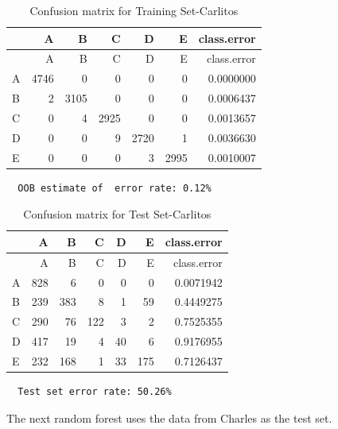 \documentclass[12pt,twoside]{reedthesis}
\begin{document}
  \begin{longtable}[c]{@{}lrrrrrr@{}}
  \caption{Confusion matrix for Training Set-Carlitos}\tabularnewline
  \toprule
  & A & B & C & D & E & class.error\tabularnewline
  \midrule
  \endfirsthead
  \toprule
  & A & B & C & D & E & class.error\tabularnewline
  \midrule
  \endhead
  A & 4746 & 0 & 0 & 0 & 0 & 0.0000000\tabularnewline
  B & 2 & 3105 & 0 & 0 & 0 & 0.0006437\tabularnewline
  C & 0 & 4 & 2925 & 0 & 0 & 0.0013657\tabularnewline
  D & 0 & 0 & 9 & 2720 & 1 & 0.0036630\tabularnewline
  E & 0 & 0 & 0 & 3 & 2995 & 0.0010007\tabularnewline
  \bottomrule
  \end{longtable}
  
  \begin{verbatim}
  OOB estimate of  error rate: 0.12%
  \end{verbatim}
  
  \begin{longtable}[c]{@{}lrrrrrr@{}}
  \caption{Confusion matrix for Test Set-Carlitos}\tabularnewline
  \toprule
  & A & B & C & D & E & class.error\tabularnewline
  \midrule
  \endfirsthead
  \toprule
  & A & B & C & D & E & class.error\tabularnewline
  \midrule
  \endhead
  A & 828 & 6 & 0 & 0 & 0 & 0.0071942\tabularnewline
  B & 239 & 383 & 8 & 1 & 59 & 0.4449275\tabularnewline
  C & 290 & 76 & 122 & 3 & 2 & 0.7525355\tabularnewline
  D & 417 & 19 & 4 & 40 & 6 & 0.9176955\tabularnewline
  E & 232 & 168 & 1 & 33 & 175 & 0.7126437\tabularnewline
  \bottomrule
  \end{longtable}
  
  \begin{verbatim}
  Test set error rate: 50.26%
  \end{verbatim}
  
  The next random forest uses the data from Charles as the test set.
  
  \begin{Shaded}
  \begin{Highlighting}[]
  \NormalTok{(}\NormalTok{)}
  
  \StringTok{ }\NormalTok{wl2[wl2$user_name ==}\StringTok{ }\NormalTok{subjects[}\NormalTok{], ]}
  \StringTok{ }\NormalTok{wl2[wl2$user_name !=}\StringTok{ }\NormalTok{subjects[}\NormalTok{], ]}
  \StringTok{ }\NormalTok{(} \NormalTok{OtherSubs3[, }\NormalTok{:}\NormalTok{], } 
                                  \NormalTok{Sub3[, }\NormalTok{:}\NormalTok{], }
                                  
                                  \NormalTok{)}
  \end{Highlighting}
  \end{Shaded}
  
\end{document}
